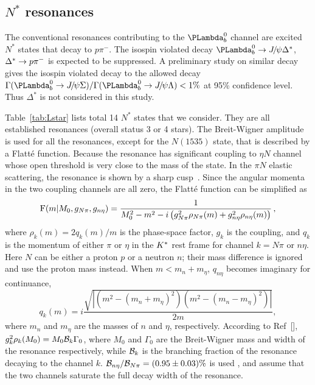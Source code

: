 \subsection{{$N^*$ resonances }}

The conventional resonances contributing to the $\Lb$ channel are excited $N^{*}$ states that decay to $p \pi^-$. 
The isospin violated decay $\Lb\to \jpsi \Delta^*$, $\Delta^*\rightarrow {\ensuremath{p}} {\ensuremath{{\pi}^-}}$ is expected to be suppressed. 
A preliminary study on similar decay gives the isospin violated decay  
to the allowed decay $\Gamma(\Lb \to \jpsi \Sigma)/\Gamma(\Lb \to \jpsi \Lambda)<1\%$ at 95\% confidence level. 
Thus $\Delta^*$ is not considered in this study.

Table~\ref{tab:Lstar} lists total 14 $N^*$ states that we consider. 
They are all established resonances (overall status 3 or 4 stars). 
The Breit-Wigner amplitude is used for all the resonances, 
except for the $N(1535)$ state, 
that is described by a Flatt{\'e} function. 
Because the resonance has significant coupling to $\eta N$ channel whose open threshold is very close to the mass of the state. 
In the $\pi N$ elastic scattering, 
the resonance is shown by a sharp cusp~\supercite{Arndt:2005dg, Arndt:2006bf}.  
Since the angular momenta in the two coupling channels are all zero, the Flatt{\'e} function can be simplified as
\begin{equation}
{\rm F}(m | M_0, g_{N\pi}, g_{n\eta} ) = \frac{1}{M_0^2-m^2 - i \left(g^2_{N\pi}\rho_{N\pi}(m)+g^2_{n\eta}\rho_{n\eta}(m)\right)} \,,
\label{SUPeq:breitwigner}
\end{equation}
where $\rho_k(m)=2q_k(m)/m$ is the phase-space factor, $g_{k}$ is the coupling,
and $q_k$ is the momentum of either $\pi$ or $\eta$ in the $K^*$ rest frame for channel $k=N\pi$ or $n\eta$.
Here $N$ can be either a proton $p$ or a neutron $n$; 
their mass difference is ignored and use the proton mass instead. 
When $m<m_n+m_\eta$, $q_{n\eta}$ becomes imaginary for continuance, \ie
\begin{equation}
q_k(m) = i\frac{\sqrt{|(m^2-(m_n+m_\eta)^2)(m^2-(m_n-m_\eta)^2)|}}{2m},
\end{equation}
where $m_n$ and $m_\eta$ are the masses of $n$ and $\eta$, respectively.
According to Ref~[\cite{Anisovich:2011fc}],  
$g^2_{k}\rho_{k}(M_0)=M_0{\cal B}_{k}\Gamma_0$, 
where $M_0$ and $\Gamma_0$ are the Breit-Wigner mass and width of the resonance respectively, 
while ${\cal B}_k$ is the branching fraction of the resonance decaying to the channel $k$. 
${\cal B}_{n\eta}/{\cal B}_{N\pi}=(0.95\pm0.03)\%$ is used \supercite{PDG}, 
and assume that the two channels saturate the full decay width of the resonance.

